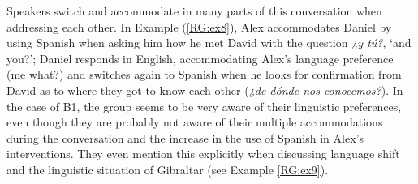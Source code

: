 \documentclass[output=paper]{langscibook}
\begin{document}
Speakers switch and accommodate in many parts of this conversation when addressing each other. In Example (\ref{RG:ex8}), Alex accommodates Daniel by using Spanish when asking him how he met David with the question \textit{¿y tú?}, ‘and you?’; Daniel responds in English, accommodating Alex’s language preference (me what?) and switches again to Spanish when he looks for confirmation from David as to where they got to know each other (\textit{¿de dónde nos conocemos?}). In the case of B1, the group seems to be very aware of their linguistic preferences, even though they are probably not aware of their multiple accommodations during the conversation and the increase in the use of Spanish in Alex’s interventions. They even mention this explicitly when discussing language shift and the linguistic situation of Gibraltar (see Example \ref{RG:ex9}).
\end{document}
